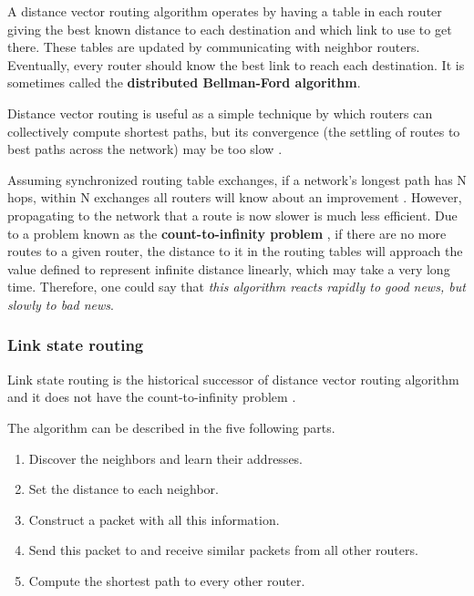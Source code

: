 \documentclass[12pt, oneside]{book}
\begin{document}
A distance vector routing algorithm operates by having a table in each router giving the best known distance to each destination and which link to use to get there.
These tables are updated by communicating with neighbor routers.
Eventually, every router should know the best link to reach each destination.
It is sometimes called the \textbf{distributed Bellman-Ford algorithm}.

Distance vector routing is useful as a simple technique by which routers can collectively compute shortest paths, but its convergence (the settling of routes to best paths across the network) may be too slow \cite[p.~372]{computer-networks-tanenbaum-2012}.

Assuming synchronized routing table exchanges, if a network's longest path has N hops, within N exchanges all routers will know about an improvement \cite[p.~372]{computer-networks-tanenbaum-2012}. However, propagating to the network that a route is now slower is much less efficient. Due to a problem known as the \textbf{count-to-infinity problem} \cite[p.~373]{computer-networks-tanenbaum-2012}, if there are no more routes to a given router, the distance to it in the routing tables will approach the value defined to represent infinite distance linearly, which may take a very long time. Therefore, one could say that \textit{this algorithm reacts rapidly to good news, but slowly to bad news}.

\subsubsection{Link state routing}

Link state routing is the historical successor of distance vector routing algorithm and it does not have the count-to-infinity problem \cite[p.~373]{computer-networks-tanenbaum-2012}.

The algorithm can be described in the five following parts.

\begin{enumerate}
    \item Discover the neighbors and learn their addresses.
    \item Set the distance to each neighbor.
    \item Construct a packet with all this information.
    \item Send this packet to and receive similar packets from all other routers.
    \item Compute the shortest path to every other router.
\end{enumerate}
\end{document}
